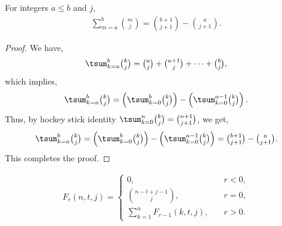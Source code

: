 \begin{lemma} 
  \label{lem:generalized-hockey-stick-identity}
  For integers $a \leq b$ and $j$,
  \begin{align*}
    \sum_{m=a}^{b} \binom{m}{j} = \binom{b+1}{j+1} - \binom{a}{j+1}.
  \end{align*}
  \begin{proof}
    We have,
    \begin{align*}
      \tsum_{k=a}^{b} \tbinom{k}{j} = \tbinom{a}{j} + \tbinom{a+1}{j}
      + \cdots + \tbinom{b}{j},
    \end{align*}
    which implies,
    \begin{align*}
      \tsum_{k=a}^{b} \tbinom{k}{j} =
      \left( \tsum_{k=0}^{b} \tbinom{k}{j} \right)
      -
      \left(\tsum_{k=0}^{a-1} \tbinom{k}{j}\right).
    \end{align*}
    Thus, by hockey stick identity
    $\tsum_{k=0}^{n} \binom{k}{j} = \binom{n+1}{j+1}$,
    we get,
    \begin{align*}
      \tsum_{k=a}^{b} \tbinom{k}{j}
      =
      \left(
        \tsum_{k=0}^{b} \tbinom{k}{j}
      \right)
      -
      \left(
        \tsum_{k=0}^{a-1} \tbinom{k}{j}
      \right)
      = \tbinom{b+1}{j+1} - \tbinom{a}{j+1}.
    \end{align*}
    This completes the proof.
  \end{proof}
\end{lemma}

\begin{definition}
  \begin{align*}
    F_{r} (n, t, j) =
    \begin{cases}
      0, \quad &r<0, \\
      \binom{n-t+j-1}{j}, \quad &r=0, \\
      \sum_{k=1}^{n} F_{r-1}(k, t, j), \quad &r>0.
    \end{cases}
  \end{align*}
\end{definition}

